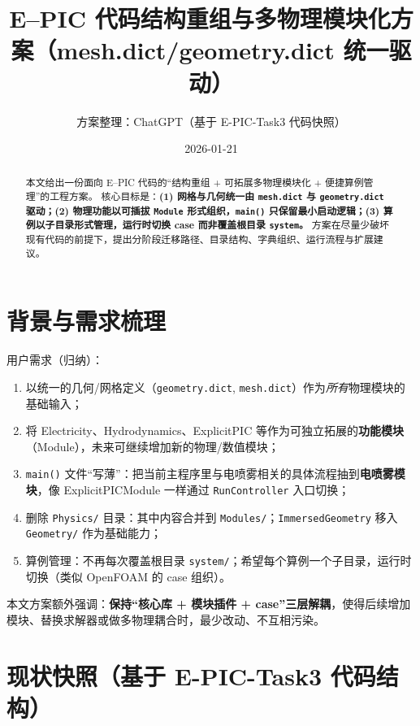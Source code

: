 \documentclass[UTF8,a4paper,11pt]{ctexart}
\title{E--PIC 代码结构重组与多物理模块化方案（mesh.dict/geometry.dict 统一驱动）}
\author{方案整理：ChatGPT（基于 E-PIC-Task3 代码快照）}
\date{2026-01-21}
\begin{document}
\maketitle

\begin{abstract}
本文给出一份面向 E--PIC 代码的“结构重组 + 可拓展多物理模块化 + 便捷算例管理”的工程方案。
核心目标是：\textbf{(1) 网格与几何统一由 \texttt{mesh.dict} 与 \texttt{geometry.dict} 驱动；(2) 物理功能以可插拔 \texttt{Module} 形式组织，\texttt{main()} 只保留最小启动逻辑；(3) 算例以子目录形式管理，运行时切换 case 而非覆盖根目录 \texttt{system}。}
方案在尽量少破坏现有代码的前提下，提出分阶段迁移路径、目录结构、字典组织、运行流程与扩展建议。
\end{abstract}

\tableofcontents
\vspace{0.8em}

\section{背景与需求梳理}

用户需求（归纳）：
\begin{enumerate}[label=\arabic*)]
  \item 以统一的几何/网格定义（\texttt{geometry.dict}, \texttt{mesh.dict}）作为\emph{所有}物理模块的基础输入；
  \item 将 Electricity、Hydrodynamics、ExplicitPIC 等作为可独立拓展的\textbf{功能模块}（Module），未来可继续增加新的物理/数值模块；
  \item \texttt{main()} 文件“写薄”：把当前主程序里与电喷雾相关的具体流程抽到\textbf{电喷雾模块}，像 ExplicitPICModule 一样通过 \texttt{RunController} 入口切换；
  \item 删除 \texttt{Physics/} 目录：其中内容合并到 \texttt{Modules/}；\texttt{ImmersedGeometry} 移入 \texttt{Geometry/} 作为基础能力；
  \item 算例管理：不再每次覆盖根目录 \texttt{system/}；希望每个算例一个子目录，运行时切换（类似 OpenFOAM 的 case 组织）。
\end{enumerate}

本文方案额外强调：\textbf{保持“核心库 + 模块插件 + case”三层解耦}，使得后续增加模块、替换求解器或做多物理耦合时，最少改动、不互相污染。

\section{现状快照（基于 E-PIC-Task3 代码结构）}
\end{document}
